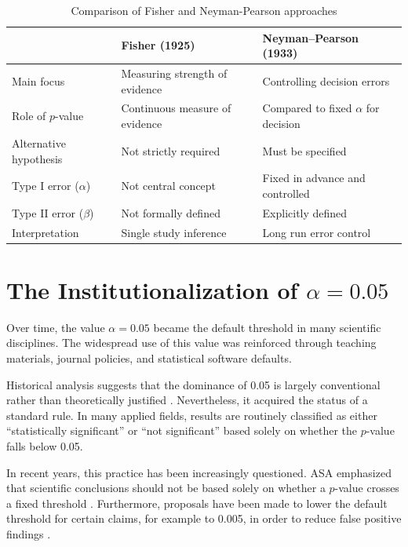 \begin{table}[htbp]
	\centering
	
	
	\begin{tabularx}{\textwidth}{X X X}
		\hline
		& Fisher (1925) & Neyman--Pearson (1933) \\
		\hline
		Main focus & Measuring strength of evidence & Controlling decision errors \\
		Role of $p$-value & Continuous measure of evidence & Compared to fixed $\alpha$ for decision \\
		Alternative hypothesis & Not strictly required & Must be specified \\
		Type I error ($\alpha$) & Not central concept & Fixed in advance and controlled \\
		Type II error ($\beta$) & Not formally defined & Explicitly defined \\
		Interpretation & Single study inference & Long run error control \\
		\hline
	\end{tabularx}
	\caption{Comparison of Fisher and Neyman-Pearson approaches}
	\label{TablefisherNP}
\end{table}




\section{The Institutionalization of $\alpha = 0.05$}

Over time, the value $\alpha = 0.05$ became the default threshold in many scientific disciplines. The widespread use of this value was reinforced through teaching materials, journal policies, and statistical software defaults.

Historical analysis suggests that the dominance of 0.05 is largely conventional rather than theoretically justified \cite{CowlesDavis1982}. Nevertheless, it acquired the status of a standard rule. In many applied fields, results are routinely classified as either ``statistically significant'' or ``not significant'' based solely on whether the $p$-value falls below 0.05.

In recent years, this practice has been increasingly questioned. ASA emphasized that scientific conclusions should not be based solely on whether a $p$-value crosses a fixed threshold \cite{WassersteinLazar2016}. Furthermore, proposals have been made to lower the default threshold for certain claims, for example to 0.005, in order to reduce false positive findings \cite{Benjamin2018}.

